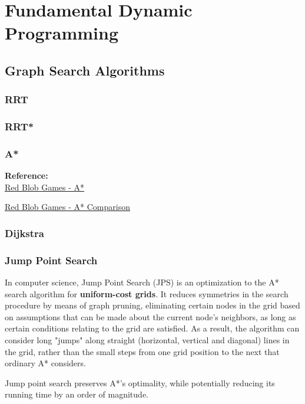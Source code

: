 \section{Fundamental Dynamic Programming}

\subsection{Graph Search Algorithms}

\subsubsection{RRT}

\subsubsection{RRT*}

\subsubsection{A*}

\textbf{Reference:} \\
\href{https://www.redblobgames.com/pathfinding/a-star/}{Red Blob Games - A*}

\href{http://theory.stanford.edu/~amitp/GameProgramming/AStarComparison.html}{Red Blob Games - A* Comparison}


\subsubsection{Dijkstra}

\subsubsection{Jump Point Search}

In computer science, Jump Point Search (JPS) is an optimization to the A* search algorithm for \textbf{uniform-cost grids}. It reduces symmetries in the search procedure by means of graph pruning, eliminating certain nodes in the grid based on assumptions that can be made about the current node's neighbors, as long as certain conditions relating to the grid are satisfied. As a result, the algorithm can consider long "jumps" along straight (horizontal, vertical and diagonal) lines in the grid, rather than the small steps from one grid position to the next that ordinary A* considers.

Jump point search preserves A*'s optimality, while potentially reducing its running time by an order of magnitude.

